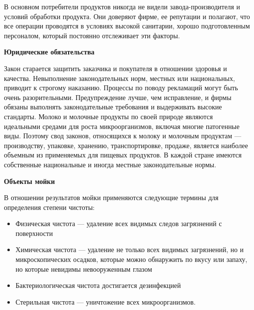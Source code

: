 \documentclass[a4paper,12pt,oneside]{extarticle}
\begin{document}
	\begin{flushleft}
		В основном потребители продуктов никогда не видели завода-производителя и условий
		обработки продукта. Они доверяют фирме, ее репутации и полагают, что все операции
		проводятся в условиях высокой санитарии, хорошо подготовленным персоналом, который
		постоянно отслеживает эти факторы.
	\end{flushleft}
	
	\begin{flushleft}
		\bfseries Юридические обязательства
	\end{flushleft}
	\begin{flushleft}
		Закон старается защитить заказчика и покупателя в отношении здоровья и качества.
		Невыполнение законодательных норм, местных или национальных, приводит к строгому
		наказанию. Процессы по поводу рекламаций могут быть очень разорительными.
		Предупреждение лучше, чем исправление, и фирмы обязаны выполнять
		законодательные требования и выдерживать высокие стандарты. Молоко и молочные
		продукты по своей природе являются идеальными средами для роста микроорганизмов,
		включая многие патогенные виды. Поэтому свод законов, относящихся к молоку и молочным
		продуктам — производству, упаковке, хранению, транспортировке, продаже, является
		наиболее объемным из применяемых для пищевых продуктов. В каждой стране имеются
		собственные национальные и иногда местные законодательные нормы.
	\end{flushleft}
	
	\begin{flushleft}
		\bfseries Объекты мойки
	\end{flushleft}
	
	\begin{flushleft}
		В отношении результатов мойки применяются следующие термины для определения
		степени чистоты:
	\end{flushleft}
	
	\begin{flushleft}
		\begin{itemize}
			\item Физическая чистота — удаление всех видимых следов загрязнений с поверхности
			\item Химическая чистота — удаление не только всех видимых загрязнений, но и микроскопических осадков, которые можно обнаружить по вкусу или запаху, но которые невидимы невооруженным глазом
			\item Бактериологическая чистота достигается дезинфекцией
			\item Стерильная чистота — уничтожение всех микроорганизмов.
		\end{itemize}
	\end{flushleft}
	
\end{document}
